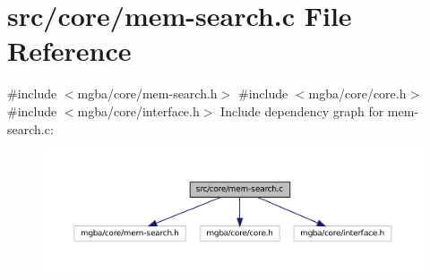 \hypertarget{mem-search_8c}{}\section{src/core/mem-\/search.c File Reference}
\label{mem-search_8c}
{\ttfamily \#include $<$mgba/core/mem-\/search.\+h$>$}\newline
{\ttfamily \#include $<$mgba/core/core.\+h$>$}\newline
{\ttfamily \#include $<$mgba/core/interface.\+h$>$}\newline
Include dependency graph for mem-\/search.c\+:
\nopagebreak
\begin{figure}[H]
\begin{center}
\leavevmode
\includegraphics[width=350pt]{mem-search_8c__incl}
\end{center}
\end{figure}

